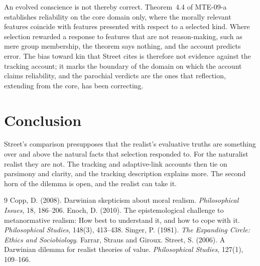\documentclass{situationist-preprint}
\begin{document}
\begin{reply}
An evolved conscience is not thereby correct. Theorem~4.4 of MTE-09-a establishes reliability on the core domain only, where the morally relevant features coincide with features presented with respect to a selected kind. Where selection rewarded a response to features that are not reason-making, such as mere group membership, the theorem says nothing, and the account predicts error. The bias toward kin that Street cites is therefore not evidence against the tracking account; it marks the boundary of the domain on which the account claims reliability, and the parochial verdicts are the ones that reflection, extending from the core, has been correcting.
\end{reply}

\section{Conclusion}

Street's comparison presupposes that the realist's evaluative truths are something over and above the natural facts that selection responded to. For the naturalist realist they are not. The tracking and adaptive-link accounts then tie on parsimony and clarity, and the tracking description explains more. The second horn of the dilemma is open, and the realist can take it.

\begin{thebibliography}{9}\small
{} Copp, D. (2008). Darwinian skepticism about moral realism. \emph{Philosophical Issues}, 18, 186--206.
 Enoch, D. (2010). The epistemological challenge to metanormative realism: How best to understand it, and how to cope with it. \emph{Philosophical Studies}, 148(3), 413--438.
 Singer, P. (1981). \emph{The Expanding Circle: Ethics and Sociobiology}. Farrar, Straus and Giroux.
 Street, S. (2006). A Darwinian dilemma for realist theories of value. \emph{Philosophical Studies}, 127(1), 109--166.
\end{thebibliography}
\end{document}
